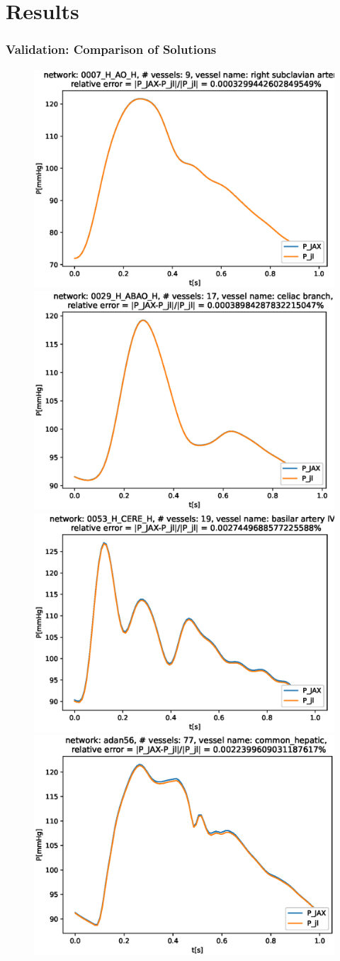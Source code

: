 \documentclass{beamer}
\begin{document}
	\section{Results}
	\begin{frame}
		\frametitle{Validation: Comparison of Solutions}
		\begin{figure} [H]
			\centering
			\includegraphics[width=0.46\columnwidth]{images/0007_H_AO_H_right_subclavian_artery_P.eps}
			\includegraphics[width=0.46\columnwidth]{images/0029_H_ABAO_H_celiac_branch_P.eps
			}
			\includegraphics[width=0.46\columnwidth]{images/0053_H_CERE_H_basilar_artery_IV_P.eps}
			\includegraphics[width=0.46\columnwidth]{images/adan56_common_hepatic_P.eps}
			\label{fig:val}
		\end{figure}
	\end{frame}
\end{document}
